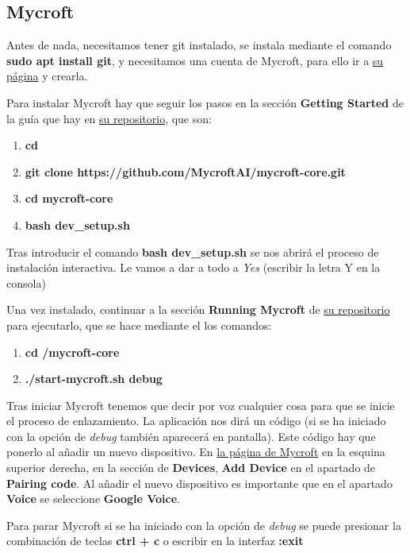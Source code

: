 \subsection{Mycroft}
Antes de nada, necesitamos tener git instalado, se instala mediante el comando \textbf{sudo apt install git}, y necesitamos una cuenta de Mycroft, para ello ir a \href{https://home.mycroft.ai/}{su página} y crearla.

Para instalar Mycroft hay que seguir los pasos en la sección \textbf{Getting Started} de la guía que hay en \href{https://github.com/MycroftAI/mycroft-core}{su repositorio}, que son:
\begin{enumerate}
	\item \textbf{cd \detokenize{~}}
	\item \textbf{git clone https://github.com/MycroftAI/mycroft-core.git}
	\item \textbf{cd mycroft-core}
	\item \textbf{bash dev\_setup.sh}
\end{enumerate}

Tras introducir el comando \textbf{bash dev\_setup.sh} se nos abrirá el proceso de instalación interactiva. Le vamos a dar a todo a \textit{Yes} (escribir la letra Y en la consola) 

Una vez instalado, continuar a la sección \textbf{Running Mycroft} de \href{https://github.com/MycroftAI/mycroft-core}{su repositorio} para ejecutarlo, que se hace mediante el los comandos:
\begin{enumerate}
	\item \textbf{cd \detokenize{~}/mycroft-core}
	\item \textbf{./start-mycroft.sh debug}
\end{enumerate}

Tras iniciar Mycroft tenemos que decir por voz cualquier cosa para que se inicie el proceso de enlazamiento. La aplicación nos dirá un código (si se ha iniciado con la opción de \textit{debug} también aparecerá en pantalla). Este código hay que ponerlo al añadir un nuevo dispositivo. En \href{https://home.mycroft.ai}{la página de Mycroft} en la esquina superior derecha, en la sección de \textbf{Devices}, \textbf{Add Device} en el apartado de \textbf{Pairing code}. Al añadir el nuevo dispositivo es importante que en el apartado \textbf{Voice} se seleccione \textbf{Google Voice}.

Para parar Mycroft si se ha iniciado con la opción de \textit{debug} se puede presionar la combinación de teclas \textbf{ctrl + c} o escribir en la interfaz \textbf{:exit}

